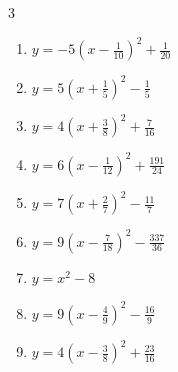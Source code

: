 \begin{multicols}{3}
\begin{enumerate}

  \item $\displaystyle y=-5\left( x-\frac{1}{10}\right)^{2}+\frac{1}{20}$


  \item $\displaystyle y=5\left( x+\frac{1}{5}\right)^{2}-\frac{1}{5}$


  \item $\displaystyle y=4\left( x+\frac{3}{8}\right)^{2}+\frac{7}{16}$


  \item $\displaystyle y=6\left( x-\frac{1}{12}\right)^{2}+\frac{191}{24}$


  \item $\displaystyle y=7\left( x+\frac{2}{7}\right)^{2}-\frac{11}{7}$


  \item $\displaystyle y=9\left( x-\frac{7}{18}\right)^{2}-\frac{337}{36}$


  \item $\displaystyle y=x^{2}-8$

        \phantom{$\displaystyle 頂点\left( 0 , -8 \right)$}

\columnbreak %

  \item $\displaystyle y=9\left( x-\frac{4}{9}\right)^{2}-\frac{16}{9}$


  \item $\displaystyle y=4\left( x-\frac{3}{8}\right)^{2}+\frac{23}{16}$



\end{enumerate}
\end{multicols}
